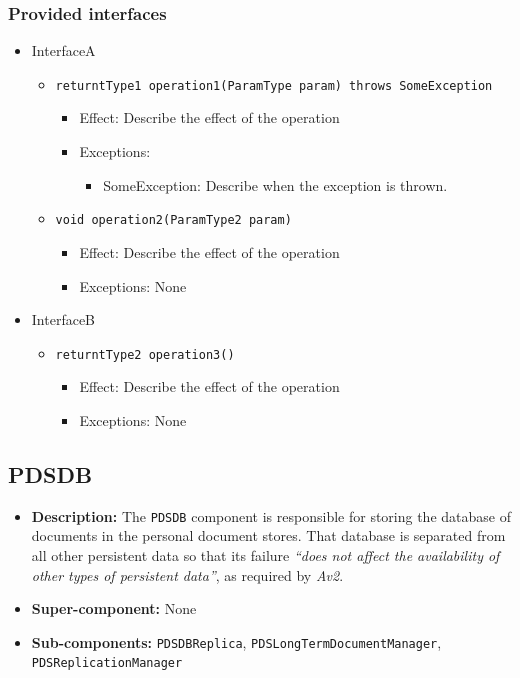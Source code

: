 \documentclass[a4paper,10pt]{article}
\begin{document}
\subsubsection*{Provided interfaces}
\begin{itemize}
    \item InterfaceA
    \begin{itemize}
        \item \texttt{returntType1 operation1(ParamType param) throws SomeException}
        \begin{itemize}
            \item Effect: Describe the effect of the operation
            \item Exceptions:
            \begin{itemize}
                \item SomeException: Describe when the exception is thrown.
            \end{itemize}
		\end{itemize}
        \item \texttt{void operation2(ParamType2 param)}
        \begin{itemize}
            \item Effect: Describe the effect of the operation
            \item Exceptions: None
        \end{itemize}
    \end{itemize}

    \item InterfaceB
    \begin{itemize}
        \item \texttt{returntType2 operation3()}
        \begin{itemize}
            \item Effect: Describe the effect of the operation
            \item Exceptions: None
        \end{itemize}
    \end{itemize}
\end{itemize}

\subsection{PDSDB}
\begin{itemize}
    \item \textbf{Description:} The \texttt{PDSDB} component is responsible for storing the database of documents in the personal document stores.  That database is separated from all other persistent data so that its failure \emph{``does not affect the availability of other types of persistent data''}, as required by \emph{Av2}.
    \item \textbf{Super-component:} None
    \item \textbf{Sub-components:} \texttt{PDSDBReplica}, \texttt{PDSLongTermDocumentManager}, \texttt{PDSReplicationManager}
\end{itemize}
\end{document}
